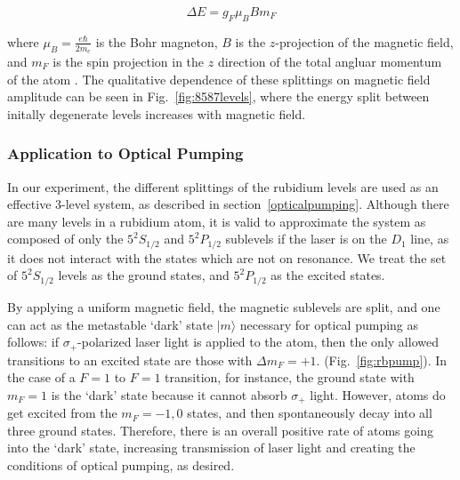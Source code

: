 \begin{equation}
\Delta E = g_F\mu_B B m_F
\label{eqn:zeeman}
\end{equation}

where $\mu_B = \frac{e\hbar}{2m_e}$ is the Bohr magneton, $B$ is the
$z$-projection of the magnetic field, and $m_F$ is the spin projection
in the $z$ direction of the total angluar momentum of the atom
\cite{budker}. The qualitative dependence of these splittings on
magnetic field amplitude can be seen in Fig.~\ref{fig:8587levels},
where the energy split between initally degenerate levels increases
with magnetic field.

\subsubsection{Application to Optical Pumping}

In our experiment, the different splittings of the rubidium levels are
used as an effective 3-level system, as described in
section~\ref{opticalpumping}. Although there are many levels in a
rubidium atom, it is valid to approximate the system as composed of
only the $5^2S_{1/2}$ and $5^2P_{1/2}$ sublevels if the laser is on
the $D_1$ line, as it does not interact with the states which are not on
resonance. We treat the set of $5^2S_{1/2}$ levels as the ground
states, and $5^2P_{1/2}$ as the excited states. 

By applying a uniform magnetic field, the magnetic sublevels are
split, and one can act as the metastable `dark' state $|m\rangle$
necessary for optical pumping as follows: if $\sigma_+$-polarized
laser light is applied to the atom, then the only allowed transitions
to an excited state are those with $\Delta m_F = +1$.
(Fig.~\ref{fig:rbpump}). In the case of a $F = 1$ to $F = 1$
transition, for instance, the ground state with $m_F = 1$ is the
`dark' state because it cannot absorb $\sigma_+$ light. However, atoms
do get excited from the $m_F = -1, 0$ states, and then spontaneously
decay into all three ground states. Therefore, there is an overall
positive rate of atoms going into the `dark' state, increasing
transmission of laser light and creating the conditions of optical pumping, as desired. 

